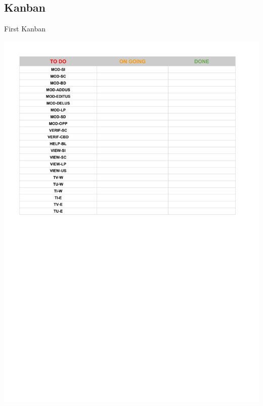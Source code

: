 \documentclass{beamer}
\begin{document}
\subsection{Kanban}

\begin{frame}{First Kanban}
	\begin{center}
        \includegraphics[scale=0.45]{Kanban1.pdf}
        \end{center}
\end{frame}
\end{document}
